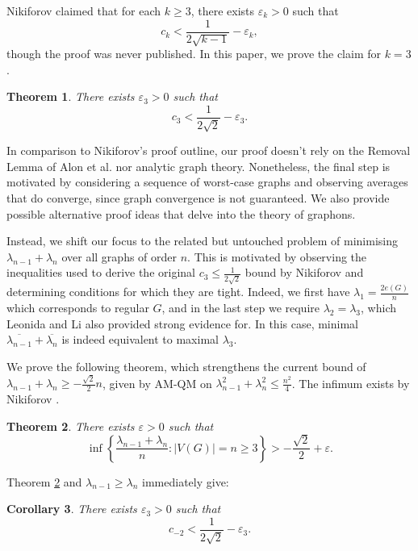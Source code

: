 \documentclass[11pt]{article}
\newtheorem{thm}{Theorem}[section]
\newtheorem{cor}[thm]{Corollary}
\begin{document}
Nikiforov claimed that for each $k \ge 3$, there exists $\varepsilon_k > 0$ such that
\[c_k < \frac{1}{2\sqrt{k-1}} - \varepsilon_k,\]
though the proof was never published. In this paper, we prove the claim for $k = 3$. 

\begin{thm}\label{thm:worst}
    There exists $\varepsilon_3 > 0$ such that
    \[c_3 < \frac{1}{2\sqrt{2}} - \varepsilon_3.\]
\end{thm}

In comparison to Nikiforov's proof outline, our proof doesn't rely on the Removal Lemma of Alon et al. \cite{alon2000testing} nor analytic graph theory. Nonetheless, the final step is motivated by considering a sequence of worst-case graphs and observing averages that do converge, since graph convergence is not guaranteed. We also provide possible alternative proof ideas that delve into the theory of graphons. 

Instead, we shift our focus to the related but untouched problem of minimising $\lambda_{n-1} + \lambda_n$ over all graphs of order $n$. This is motivated by observing the inequalities used to derive the original $c_3 \le \frac{1}{2\sqrt{2}}$ bound by Nikiforov \cite{nikiforov2015extrema} and determining conditions for which they are tight. Indeed, we first have $\lambda_1 = \frac{2e(G)}{n}$ which corresponds to regular $G$, and in the last step we require $\lambda_2 = \lambda_3$, which Leonida and Li \cite{leonida2024structure} also provided strong evidence for. In this case, minimal $\overline{\lambda_{n-1}} + \overline{\lambda_n}$ is indeed equivalent to maximal $\lambda_3$. 

We prove the following theorem, which strengthens the current bound of $\lambda_{n-1} + \lambda_n \ge -\frac{\sqrt{2}}{2}n$, given by AM-QM on $\lambda_{n-1}^2 + \lambda_n^2 \le \frac{n^2}{4}$. The infimum exists by Nikiforov \cite{nikiforov2006combinations}. 

\begin{thm}\label{thm:worst-sum}
    There exists $\varepsilon > 0$ such that
    \[\inf\left\{\frac{\lambda_{n-1} + \lambda_n}{n} : |V(G)| = n \ge 3\right\} > -\frac{\sqrt{2}}{2} + \varepsilon.\]
\end{thm}

Theorem \ref{thm:worst-sum} and $\lambda_{n-1} \ge \lambda_n$ immediately give:

\begin{cor}\label{cor:worst-2}
    There exists $\varepsilon_3 > 0$ such that
    \[c_{-2} < \frac{1}{2\sqrt{2}} - \varepsilon_3.\]
\end{cor}
\end{document}
